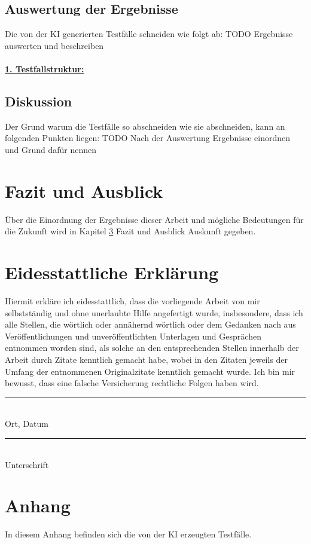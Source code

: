 \documentclass[12pt,toc=bib,toc=listof]{scrreprt}
\begin{document}
\section{Auswertung der Ergebnisse} %
\label{sec:auswertungDerErgebnisse}
Die von der KI generierten Testfälle schneiden wie folgt ab:
TODO Ergebnisse auswerten und beschreiben\\
\\\textbf{\underline{1. Testfallstruktur:}}\\

\section{Diskussion} %
\label{sec:diskussion}
Der Grund warum die Testfälle so abschneiden wie sie abschneiden, kann an folgenden Punkten liegen:
TODO Nach der Auswertung Ergebnisse einordnen und Grund dafür nennen

\chapter{Fazit und Ausblick} %
\label{sec:fazitUndAusblick}
Über die Einordnung der Ergebnisse dieser Arbeit und mögliche Bedeutungen für die Zukunft wird in Kapitel \ref{sec:fazitUndAusblick} Fazit und Ausblick Auskunft gegeben.

\printbibliography
\newpage

\chapter*{Eidesstattliche Erklärung} %
\label{sec:eidesstattlicheErklärung}
Hiermit erkläre ich eidesstattlich, dass die vorliegende Arbeit von mir selbstständig und ohne unerlaubte Hilfe angefertigt wurde, insbesondere, dass ich alle Stellen, die wörtlich oder annähernd wörtlich oder dem Gedanken nach aus Veröffentlichungen und unveröffentlichten Unterlagen und Gesprächen entnommen worden sind, als solche an den entsprechenden Stellen innerhalb der Arbeit durch Zitate kenntlich gemacht habe, wobei in den Zitaten jeweils der Umfang der entnommenen Originalzitate kenntlich gemacht wurde. Ich bin mir bewusst, dass eine falsche Versicherung rechtliche Folgen haben wird.
\newline
\newline
\newline
\newline
\noindent
\begin{minipage}[t]{0.4\textwidth} 
    \centering 
    \rule{\textwidth}{0.4pt} \\ 
    Ort, Datum
\end{minipage}%
\hfill
\begin{minipage}[t]{0.4\textwidth} 
    \centering 
    \rule{\textwidth}{0.4pt} \\ 
    Unterschrift
\end{minipage}

\chapter*{Anhang} %
\label{sec:anhang}
In diesem Anhang befinden sich die von der KI erzeugten Testfälle.

\end{document}
